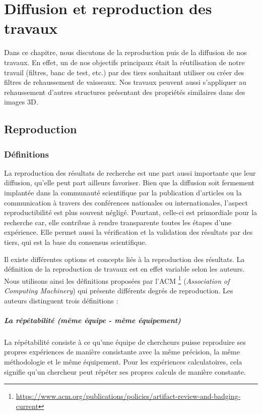 \chapter{Diffusion et reproduction des travaux}
\label{sec:reproductibility}
Dans ce chapitre, nous discutons de la reproduction puis de la diffusion de nos travaux. En effet, un de nos objectifs principaux était la réutilisation de notre travail (filtres, banc de test, etc.) par des tiers souhaitant utiliser ou créer des filtres de rehaussement de vaisseaux. Nos travaux peuvent aussi s'appliquer au rehaussement d'autres structures présentant des propriétés similaires dans des images 3D.
\section{Reproduction}
\subsection{Définitions}
La reproduction des résultats de recherche est une part aussi importante que leur diffusion, qu'elle peut part ailleurs favoriser. Bien que la diffusion soit fermement implantée dans la communauté scientifique par la publication d'articles ou la communication à travers des conférences nationales ou internationales, l'aspect reproductibilité est plus souvent négligé. Pourtant, celle-ci est primordiale pour la recherche car, elle contribue à rendre transparente toutes les étapes d'une expérience. Elle permet aussi la vérification et la validation des résultats par des tiers, qui est la base du consensus scientifique.

Il existe différentes options et concepts liés à la reproduction des résultats. La définition de la reproduction de travaux est en effet variable selon les auteurs. Nous utilisons ainsi les définitions proposées par l'ACM \footnote{\url{https://www.acm.org/publications/policies/artifact-review-and-badging-current}} (\textit{Association of Computing Machinery}) qui présente différents degrés de reproduction. Les auteurs distinguent trois définitions : 
\paragraph{La répétabilité (même équipe - même équipement)}
La répétabilité consiste à ce qu'une équipe de chercheurs puisse reproduire ses propres expériences de manière consistante avec la même précision, la même méthodologie et le même équipement. Pour les expériences calculatoires, cela signifie qu'un chercheur peut répéter ses propres calculs de manière constante.
